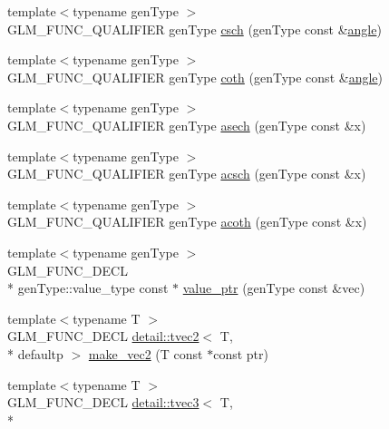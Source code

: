 \begin{DoxyCompactItemize}
\item 
{\footnotesize template$<$typename gen\-Type $>$ }\\G\-L\-M\-\_\-\-F\-U\-N\-C\-\_\-\-Q\-U\-A\-L\-I\-F\-I\-E\-R gen\-Type \hyperlink{group__gtc__reciprocal_ga00404a9cdf62023792d1d0afedd7f896}{csch} (gen\-Type const \&\hyperlink{group__gtc__quaternion_ga23a3fc7ada5bbb665ff84c92c6e0542c}{angle})
\item 
{\footnotesize template$<$typename gen\-Type $>$ }\\G\-L\-M\-\_\-\-F\-U\-N\-C\-\_\-\-Q\-U\-A\-L\-I\-F\-I\-E\-R gen\-Type \hyperlink{group__gtc__reciprocal_gae2f1e6f7c360dda452b88e0c492d6f4d}{coth} (gen\-Type const \&\hyperlink{group__gtc__quaternion_ga23a3fc7ada5bbb665ff84c92c6e0542c}{angle})
\item 
{\footnotesize template$<$typename gen\-Type $>$ }\\G\-L\-M\-\_\-\-F\-U\-N\-C\-\_\-\-Q\-U\-A\-L\-I\-F\-I\-E\-R gen\-Type \hyperlink{group__gtc__reciprocal_ga450f3bf1c04751198994d26d92ac2a63}{asech} (gen\-Type const \&x)
\item 
{\footnotesize template$<$typename gen\-Type $>$ }\\G\-L\-M\-\_\-\-F\-U\-N\-C\-\_\-\-Q\-U\-A\-L\-I\-F\-I\-E\-R gen\-Type \hyperlink{group__gtc__reciprocal_ga418b31539e1a69c262712f2c7a4f27eb}{acsch} (gen\-Type const \&x)
\item 
{\footnotesize template$<$typename gen\-Type $>$ }\\G\-L\-M\-\_\-\-F\-U\-N\-C\-\_\-\-Q\-U\-A\-L\-I\-F\-I\-E\-R gen\-Type \hyperlink{group__gtc__reciprocal_gad73911994e6bb6a06cc3ea1bd89201ab}{acoth} (gen\-Type const \&x)
\item 
{\footnotesize template$<$typename gen\-Type $>$ }\\G\-L\-M\-\_\-\-F\-U\-N\-C\-\_\-\-D\-E\-C\-L \\*
gen\-Type\-::value\-\_\-type const $\ast$ \hyperlink{group__gtc__type__ptr_gaf019636bb8bd7c9efb7c7ce3bb23bcfc}{value\-\_\-ptr} (gen\-Type const \&vec)
\item 
{\footnotesize template$<$typename T $>$ }\\G\-L\-M\-\_\-\-F\-U\-N\-C\-\_\-\-D\-E\-C\-L \hyperlink{structglm_1_1detail_1_1tvec2}{detail\-::tvec2}$<$ T, \\*
defaultp $>$ \hyperlink{group__gtc__type__ptr_ga70f570befb4773ba3a658b76f9fdd6ab}{make\-\_\-vec2} (T const $\ast$const ptr)
\item 
{\footnotesize template$<$typename T $>$ }\\G\-L\-M\-\_\-\-F\-U\-N\-C\-\_\-\-D\-E\-C\-L \hyperlink{structglm_1_1detail_1_1tvec3}{detail\-::tvec3}$<$ T, \\*

\end{DoxyCompactItemize}
